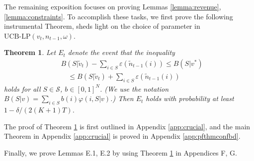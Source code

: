 \documentclass{article}
\newtheorem{theorem}{Theorem}[section]
\theoremstyle{definition}
\newcommand{\SSS}{\mathcal{S}}
\begin{document}
The remaining exposition focuses on proving Lemmas \ref{lemma:revenue}, \ref{lemma:constraints}. To accomplish these tasks, we first prove the following instrumental Theorem, sheds light on the choice of parameter in $\text{UCB-LP}(v_t, n_{t-1}, \omega)$.
\begin{theorem}\label{thm:crucial}
Let $E_t$ denote the event that the inequality  
\begin{align}\label{eq:probconfbd}
& B(S |\tilde{v}_{t}) - \sum_{i\in S} \varepsilon(\tilde{n}_{t-1}(i))\leq B(S |v ^*)  \nonumber\\
&\quad \leq B( S |\tilde{v}_{t}) + \sum_{i\in S} \varepsilon(\tilde{n}_{t-1}(i))
\end{align}
holds for all $S\in \SSS$, $b\in [0, 1]^N$. (We use the notation $B( S | v ) = \sum_{i\in S}b(i)\varphi(i, S|v)$.) Then $E_t$ holds with probability at least $1-\delta/(2(K+1)T)$.
\end{theorem}
The proof of Theorem \ref{thm:crucial} is first outlined in Appendix \ref{app:crucial}, and the main Theorem in Appendix \ref{app:crucial} is proved in Appendix \ref{app:pfthmconfbd}. 

Finally, we prove Lemmas E.1, E.2 by using Theorem \ref{thm:crucial} in Appendices F, G. 
\end{document}

